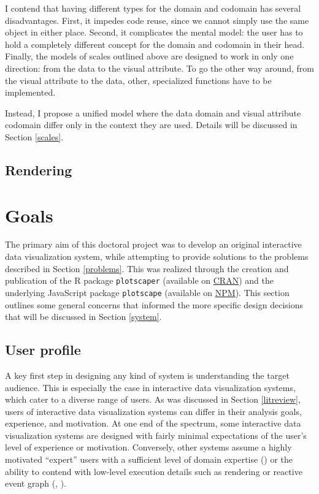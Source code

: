 \documentclass[
]{book}
\theoremstyle{definition}
\theoremstyle{definition}
\theoremstyle{definition}
\theoremstyle{definition}
\theoremstyle{remark}
\begin{document}
I contend that having different types for the domain and codomain has several disadvantages. First, it impedes code reuse, since we cannot simply use the same object in either place. Second, it complicates the mental model: the user has to hold a completely different concept for the domain and codomain in their head. Finally, the models of scales outlined above are designed to work in only one direction: from the data to the visual attribute. To go the other way around, from the visual attribute to the data, other, specialized functions have to be implemented.

Instead, I propose a unified model where the data domain and visual attribute codomain differ only in the context they are used. Details will be discussed in Section \ref{scales}.

\section{Rendering}\label{rendering}

\chapter{Goals}\label{goals}

The primary aim of this doctoral project was to develop an original interactive data visualization system, while attempting to provide solutions to the problems described in Section \ref{problems}. This was realized through the creation and publication of the R package \texttt{plotscaper} (available on \href{https://cran.r-project.org/web/packages/plotscaper/index.html}{CRAN}) and the underlying JavaScript package \texttt{plotscape} (available on \href{https://www.npmjs.com/package/@abartonicek/plotscape}{NPM}). This section outlines some general concerns that informed the more specific design decisions that will be discussed in Section \ref{system}.

\section{User profile}\label{user-profile}

A key first step in designing any kind of system is understanding the target audience. This is especially the case in interactive data visualization systems, which cater to a diverse range of users. As was discussed in Section \ref{litreview}, users of interactive data visualization systems can differ in their analysis goals, experience, and motivation. At one end of the spectrum, some interactive data visualization systems are designed with fairly minimal expectations of the user's level of experience or motivation. Conversely, other systems assume a highly motivated ``expert'' users with a sufficient level of domain expertise () or the ability to contend with low-level execution details such as rendering or reactive event graph (, ).
\end{document}
